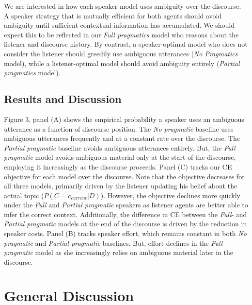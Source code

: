 \documentclass[10pt, letterpaper]{article}
\begin{document}
We are interested in how each speaker-model uses ambiguity over the
discourse. A speaker strategy that is mutually efficient for both agents
should avoid ambiguity until sufficient contextual information has
accumulated. We should expect this to be reflected in our
\textit{Full pragmatics} model who reasons about the listener and
discourse history. By contrast, a speaker-optimal model who does not
consider the listener should greedily use ambiguous utterances
(\textit{No Pragmatics} model), while a listener-optimal model should
avoid ambiguity entirely (\textit{Partial pragmatics} model).\par

\subsection{Results and Discussion}\label{results-and-discussion-1}

Figure 3, panel (A) shows the empirical probability a speaker uses an
ambiguous utterance as a function of discourse position. The
\textit{No pragmatic} baseline uses ambiguous utterances frequently and
at a constant rate over the discourse. The \textit{Partial pragmatic}
baseline avoids ambiguous utterances entirely. But, the
\textit{Full pragmatic} model avoids ambiguous material only at the
start of the discourse, employing it increasingly as the discourse
proceeds. Panel (C) tracks our CE objective for each model over the
discourse. Note that the objective decreases for all three models,
primarily driven by the listener updating his belief about the actual
topic (\(P(C=c_{current}|D)\)). However, the objective declines more
quickly under the \textit{Full} and \textit{Partial pragmatic} speakers
as listener agents are better able to infer the correct context.
Additionally, the difference in CE between the \textit{Full}- and
\textit{Partial pragmatic} models at the end of the discourse is driven
by the reduction in speaker costs. Panel (B) tracks speaker effort,
which remains constant in both \textit{No pragmatic} and
\textit{Partial pragmatic} baselines. But, effort declines in the
\textit{Full pragmatic} model as she increasingly relies on ambiguous
material later in the discourse.\par

\section{General Discussion}\label{general-discussion}
\end{document}
